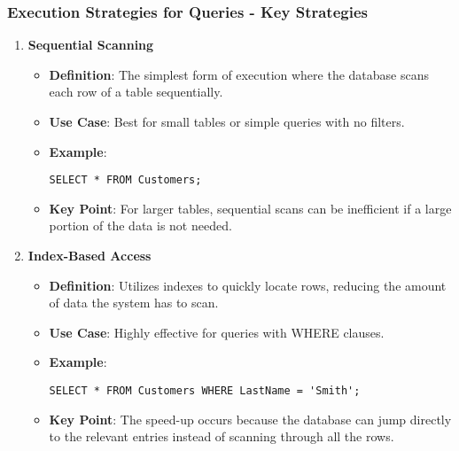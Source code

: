 \documentclass[aspectratio=169]{beamer}
\begin{document}
\begin{frame}[fragile]
    \frametitle{Execution Strategies for Queries - Key Strategies}
    \begin{enumerate}
        \item \textbf{Sequential Scanning}
        \begin{itemize}
            \item \textbf{Definition}: The simplest form of execution where the database scans each row of a table sequentially.
            \item \textbf{Use Case}: Best for small tables or simple queries with no filters.
            \item \textbf{Example}:
            \begin{lstlisting}
SELECT * FROM Customers;
            \end{lstlisting}
            \item \textbf{Key Point}: For larger tables, sequential scans can be inefficient if a large portion of the data is not needed.
        \end{itemize}

        \item \textbf{Index-Based Access}
        \begin{itemize}
            \item \textbf{Definition}: Utilizes indexes to quickly locate rows, reducing the amount of data the system has to scan.
            \item \textbf{Use Case}: Highly effective for queries with WHERE clauses.
            \item \textbf{Example}:
            \begin{lstlisting}
SELECT * FROM Customers WHERE LastName = 'Smith';
            \end{lstlisting}
            \item \textbf{Key Point}: The speed-up occurs because the database can jump directly to the relevant entries instead of scanning through all the rows.
        \end{itemize}
    \end{enumerate}
\end{frame}
\end{document}
